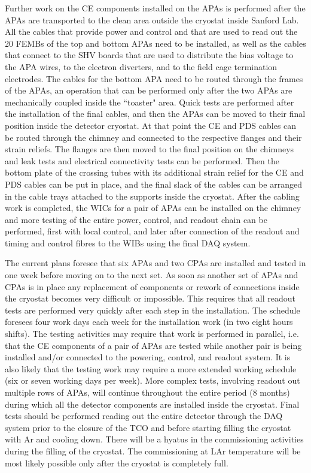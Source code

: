 Further work on the CE components installed on the APAs is performed after
the APAs are transported to the clean area outside the cryostat inside
Sanford Lab. All the cables that provide power and control and that are used
to read out the 20 FEMBs of the top and bottom APAs need to be installed,
as well as the cables that connect to the SHV boards that are used to
distribute the bias voltage to the APA wires, to the electron diverters,
and to the field cage termination electrodes. The cables for the bottom
APA need to be routed through the frames of the APAs, an operation that
can be performed only after the two APAs are mechanically coupled inside
the ``toaster" area. Quick tests are performed after the installation of the
final cables, and then the APAs can be moved to their final position inside
the detector cryostat. At that point the CE and PDS cables can be routed
through the chimney and connected to the respective flanges and their strain
reliefs. The flanges are then moved to the final position on the chimneys
and leak tests and electrical connectivity tests can be performed. Then the
bottom plate of the crossing tubes with its additional strain relief for
the CE and PDS cables can be put in place, and the final slack of the cables
can be arranged in the cable trays attached to the supports inside the cryostat.
After the cabling work is completed, the WICs for a pair of APAs can be
installed on the chimney and more testing of the entire power, control,
and readout chain can be performed, first with local control, and later
after connection of the readout and timing and control fibres to the WIBs
using the final DAQ system.

The current plans foresee that six APAs and two CPAs are installed and
tested in one week before moving on to the next set. As soon as another
set of APAs and CPAs is in place any replacement of components or rework
of connections inside the cryostat becomes very difficult or impossible.
This requires that all readout tests are performed very quickly after
each step in the installation. The schedule foresees four work days each
week for the installation work (in two eight hours shifts). The testing
activities may require that work is performed in parallel, i.e. that
the CE components of a pair of APAs are tested while another pair is
being installed and/or connected to the powering, control, and readout
system. It is also likely that the testing work may require a more
extended working schedule (six or seven working days per week). More
complex tests, involving readout out multiple rows of APAs, will continue
throughout the entire period (8 months) during which all the detector
components are installed inside the cryostat. Final tests should be
performed reading out the entire detector through the DAQ system
prior to the closure of the TCO and before starting filling the cryostat
with Ar and cooling down. There will be a hyatus in
the commissioning activities during the filling of the cryostat. The
commissioning at LAr temperature will be most likely possible only
after the cryostat is completely full.

